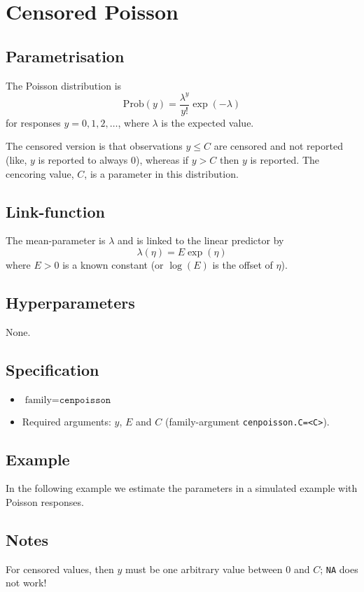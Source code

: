 \documentclass[a4paper,11pt]{article}
\begin{document}
\section*{Censored Poisson}

\subsection*{Parametrisation}

The Poisson distribution is
\begin{displaymath}
    \text{Prob}(y) = \frac{\lambda^{y}}{y!}\exp(-\lambda)
\end{displaymath}
for responses $y=0, 1, 2, \ldots$, where $\lambda$ is the expected
value.

The censored version is that observations $y \le C$ are censored and
not reported (like, $y$ is reported to always $0$), whereas if $y > C$
then $y$ is reported. The cencoring value, $C$, is a parameter in this
distribution.


\subsection*{Link-function}

The mean-parameter is $\lambda$ and is linked to the linear predictor
by
\begin{displaymath}
    \lambda(\eta) = E \exp(\eta)
\end{displaymath}
where $E>0$ is a known constant (or $\log(E)$ is the offset of $\eta$).

\subsection*{Hyperparameters}

None.

\subsection*{Specification}

\begin{itemize}
\item $\text{family}=\texttt{cenpoisson}$
\item Required arguments: $y$, $E$ and $C$ (family-argument \texttt{cenpoisson.C=<C>}).
\end{itemize}

\subsection*{Example}

In the following example we estimate the parameters in a simulated
example with Poisson responses.
{\small

}

\subsection*{Notes}

For censored values, then $y$ must be one arbitrary value between $0$
and $C$; \texttt{NA} does not work!
\end{document}
